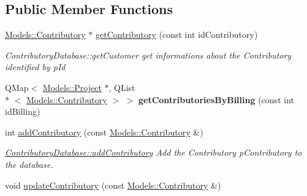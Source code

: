 \subsection*{Public Member Functions}
\begin{DoxyCompactItemize}
\item 
\hyperlink{classModels_1_1Contributory}{Models\+::\+Contributory} $\ast$ \hyperlink{classDatabase_1_1ContributoryDatabase_afe8913f62dfb75115090650d194a7bc4}{get\+Contributory} (const int id\+Contributory)
\begin{DoxyCompactList}\small\item\em Contributory\+Database\+::get\+Customer get informations about the Contributory identified by {\itshape p\+Id} \end{DoxyCompactList}\item 
\hypertarget{classDatabase_1_1ContributoryDatabase_ad5c2a9908b0ad088eed587a16dc6fc07}{Q\+Map$<$ \hyperlink{classModels_1_1Project}{Models\+::\+Project} $\ast$, Q\+List\\*
$<$ \hyperlink{classModels_1_1Contributory}{Models\+::\+Contributory} $>$ $>$ {\bfseries get\+Contributories\+By\+Billing} (const int id\+Billing)}\label{classDatabase_1_1ContributoryDatabase_ad5c2a9908b0ad088eed587a16dc6fc07}

\item 
int \hyperlink{classDatabase_1_1ContributoryDatabase_a7612a74e10fc04a5894bf01b6917a42e}{add\+Contributory} (const \hyperlink{classModels_1_1Contributory}{Models\+::\+Contributory} \&)
\begin{DoxyCompactList}\small\item\em \hyperlink{classDatabase_1_1ContributoryDatabase_a7612a74e10fc04a5894bf01b6917a42e}{Contributory\+Database\+::add\+Contributory} Add the Contributory {\itshape p\+Contributory} to the database. \end{DoxyCompactList}\item 
\hypertarget{classDatabase_1_1ContributoryDatabase_a7f0abb17daa85b89f1a756a7ee2e482c}{void \hyperlink{classDatabase_1_1ContributoryDatabase_a7f0abb17daa85b89f1a756a7ee2e482c}{update\+Contributory} (const \hyperlink{classModels_1_1Contributory}{Models\+::\+Contributory} \&)}\label{classDatabase_1_1ContributoryDatabase_a7f0abb17daa85b89f1a756a7ee2e482c}


\end{DoxyCompactItemize}
